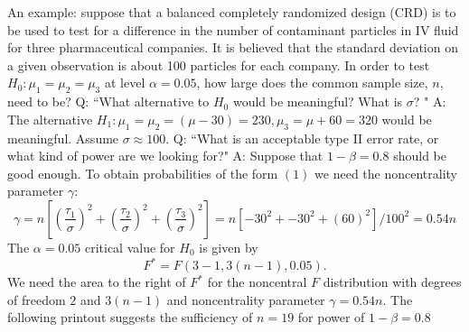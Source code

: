 \newpage
\bigkn
An example: suppose that a balanced completely randomized design (CRD) is to be
used to test for a difference in the number of contaminant particles 
in IV fluid for three pharmaceutical companies.  It is believed that
the standard deviation on a given observation is about 100 particles
for each company.  In order to test $H_0: \mu_1=\mu_2=\mu_3$ at level
$\alpha=0.05$, how large does the common sample size, $n$, need to be?
\bigkn
Q: ``What alternative to $H_0$ would be meaningful?  What is $\sigma$? " 
\bigkn
A: The alternative $H_1:\mu_1=\mu_2=(\mu-30)=230, \mu_3=\mu+60=320$ would be meaningful.  Assume $\sigma \approx 100$.
\bigkn
Q: ``What is an acceptable type II error rate, or what kind of power are we
looking for?" 
\bigkn
A: Suppose that $1-\beta=0.8$ should be good enough.
\bigkn
To obtain probabilities of the form $(1)$ we need the noncentrality parameter
$\gamma:$
$$ \gamma=n [(\frac{\tau_1}{\sigma})^2 +(\frac{\tau_2}{\sigma})^2 +(\frac{\tau_3}{\sigma})^2]=n [-30^2+-30^2+(60)^2]/100^2=0.54n $$
The $\alpha=0.05$ critical value for $H_0$ is given by
$$ F^*=F(3-1,3(n-1),0.05).$$
We need the area to the right of $F^*$ for the noncentral $F$ distribution
with degrees of freedom $2$ and $3(n-1)$ and noncentrality parameter 
$\gamma=0.54n.$  
The following printout suggests the sufficiency of $n=19$ for power
of $1-\beta=0.8$
\newpage
